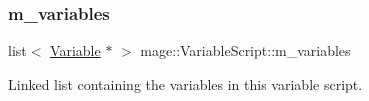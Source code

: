\subsubsection{\texorpdfstring{m\+\_\+variables}{m\_variables}}
{\footnotesize\ttfamily list$<$ \hyperlink{structmage_1_1_variable}{Variable} $\ast$ $>$ mage\+::\+Variable\+Script\+::m\+\_\+variables\hspace{0.3cm}{\ttfamily [protected]}}

Linked list containing the variables in this variable script. 
